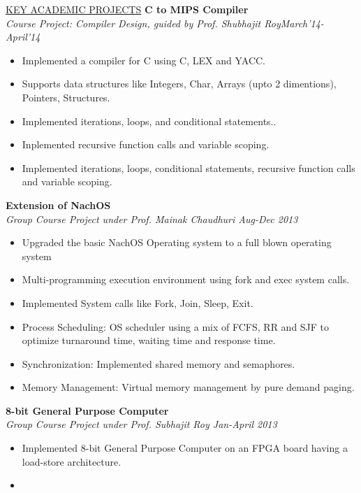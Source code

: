\documentclass[10pt]{res}
\begin{document}
\begin{resume}
\begin{section}{\underline{KEY ACADEMIC PROJECTS}}
{\bf C to MIPS Compiler}\\
\vspace{0.1in}
\textit{Course Project: Compiler Design, guided by Prof. Shubhajit Roy\hfill March'14-April'14}
\vspace{0.1in}
\begin{itemize}
\item{
Implemented a compiler for C using C, LEX and YACC.
}
\item{
Supports data structures like Integers, Char, Arrays (upto 2 dimentions), Pointers, Structures.
}
\item{
Implemented iterations, loops, and conditional statements..
}
\item{
Inplemented recursive function calls and variable scoping.
}
\item{
Implemented iterations, loops, conditional statements, recursive function calls and variable scoping.
}
\end{itemize}
{\bf Extension of NachOS}\\
\textit{Group Course Project under Prof. Mainak Chaudhuri \hfill Aug-Dec 2013}
\vspace{0.1in}
\begin{itemize}
\item{
Upgraded the basic NachOS Operating system to a full blown operating system
}
\item{
Multi-programming execution environment using fork and exec system calls.
}
\item{
Implemented System calls like Fork, Join, Sleep, Exit.
}
\item{
Process Scheduling: OS scheduler using a mix of FCFS, RR and SJF to optimize turnaround time, waiting time and response time.
}
\item{
Synchronization: Implemented shared memory and semaphores.
}
\item{
Memory Management: Virtual memory management by pure demand paging.
}
\end{itemize}
{\bf 8-bit General Purpose Computer}\\
\textit{Group Course Project under Prof. Subhajit Roy \hfill Jan-April 2013}
\vspace{0.1in}
\begin{itemize}
\item{
Implemented 8-bit General Purpose Computer on an FPGA board having a load-store architecture.
}
\item{
}
\end{itemize}
\end{section}
\end{resume}
\end{document}
